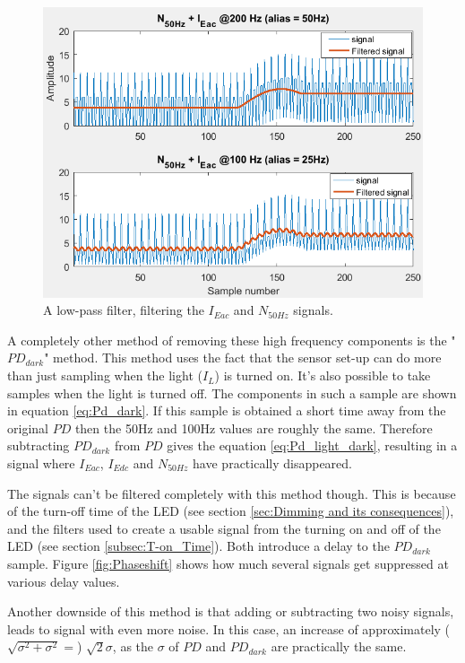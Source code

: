 \begin{figure}
	\includegraphics[width=\textwidth]{pics/FirFilter_vs_allias.png}
	\caption{A low-pass filter, filtering the $I_{Eac}$ and $N_{50Hz}$ signals.}
	\label{fig:FilterVSAllias}
\end{figure}

A completely other method of removing these high frequency components is the "$PD_{dark}$" method. This method uses the fact that the sensor set-up can do more than just sampling when the light ($I_{L}$) is turned on. It's also possible to take samples when the light is turned off. The components in such a sample are shown in equation \ref{eq:Pd_dark}. If this sample is obtained a short time away from the original $PD$ then the 50Hz and 100Hz values are roughly the same. Therefore subtracting $PD_{dark}$ from $PD$ gives the equation \ref{eq:Pd_light_dark}, resulting in a signal where $I_{Eac}$, $I_{Edc}$ and $N_{50Hz}$ have practically disappeared.


The signals can't be filtered completely with this method though. This is because of the turn-off time of the LED (see section \ref{sec:Dimming and its consequences}), and the filters used to create a usable signal from the turning on and off of the LED (see section \ref{subsec:T-on_Time}). Both introduce a delay to the $PD_{dark}$ sample. Figure \ref{fig:Phaseshift} shows how much several signals get suppressed at various delay values.

Another downside of this method is that adding or subtracting two noisy signals, leads to signal with even more noise. In this case, an increase of approximately ($\sqrt{\sigma^2+\sigma^2} =$) $\sqrt{2} \sigma$\cite{@needref@}, as the $\sigma$ of $PD$ and $PD_{dark}$ are practically the same.

